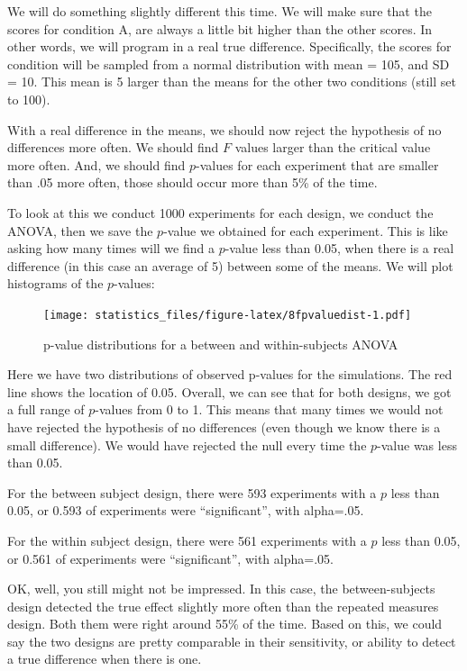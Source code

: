 \documentclass[]{book}
\begin{document}
We will do something slightly different this time. We will make sure that the scores for condition A, are always a little bit higher than the other scores. In other words, we will program in a real true difference. Specifically, the scores for condition will be sampled from a normal distribution with mean = 105, and SD = 10. This mean is 5 larger than the means for the other two conditions (still set to 100).

With a real difference in the means, we should now reject the hypothesis of no differences more often. We should find \(F\) values larger than the critical value more often. And, we should find \(p\)-values for each experiment that are smaller than .05 more often, those should occur more than 5\% of the time.

To look at this we conduct 1000 experiments for each design, we conduct the ANOVA, then we save the \(p\)-value we obtained for each experiment. This is like asking how many times will we find a \(p\)-value less than 0.05, when there is a real difference (in this case an average of 5) between some of the means. We will plot histograms of the \(p\)-values:

\begin{figure}
\centering
\texttt{[image: statistics\_files/figure-latex/8fpvaluedist-1.pdf]}
\caption{\label{fig:8fpvaluedist}p-value distributions for a between and within-subjects ANOVA}
\end{figure}

Here we have two distributions of observed p-values for the simulations. The red line shows the location of 0.05. Overall, we can see that for both designs, we got a full range of \(p\)-values from 0 to 1. This means that many times we would not have rejected the hypothesis of no differences (even though we know there is a small difference). We would have rejected the null every time the \(p\)-value was less than 0.05.

For the between subject design, there were 593 experiments with a \(p\) less than 0.05, or 0.593 of experiments were ``significant'', with alpha=.05.

For the within subject design, there were 561 experiments with a \(p\) less than 0.05, or 0.561 of experiments were ``significant'', with alpha=.05.

OK, well, you still might not be impressed. In this case, the between-subjects design detected the true effect slightly more often than the repeated measures design. Both them were right around 55\% of the time. Based on this, we could say the two designs are pretty comparable in their sensitivity, or ability to detect a true difference when there is one.
\end{document}
